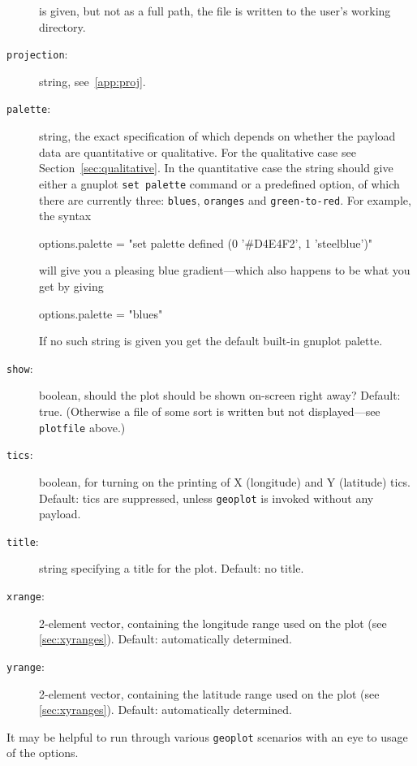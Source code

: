 \documentclass{article}
\begin{document}
\begin{description}
  is given, but not as a full path, the file is written to the user's
  working directory.
\item[\texttt{projection}:] string, see~\ref{app:proj}.
\item[\texttt{palette}:] string, the exact specification of which
  depends on whether the payload data are quantitative or
  qualitative. For the qualitative case see
  Section~\ref{sec:qualitative}. In the quantitative case the string
  should give either a \textsf{gnuplot} \texttt{set palette} command
  or a predefined option, of which there are currently three:
  \texttt{blues}, \texttt{oranges} and \texttt{green-to-red}. For
  example, the syntax
  \begin{code}
    options.palette = "set palette defined (0 '#D4E4F2', 1 'steelblue')"
  \end{code}
  will give you a pleasing blue gradient---which also happens to be
  what you get by giving
  \begin{code}
    options.palette = "blues"
  \end{code}
  If no such string is given you get the default built-in
  \textsf{gnuplot} palette.
\item[\texttt{show}:] boolean, should the plot should be shown
  on-screen right away? Default: true. (Otherwise a file of some sort
  is written but not displayed---see \texttt{plotfile} above.)
\item[\texttt{tics}:] boolean, for turning on the printing of X
  (longitude) and Y (latitude) tics. Default: tics are suppressed,
  unless \texttt{geoplot} is invoked without any payload.
\item[\texttt{title}:] string specifying a title for the
  plot. Default: no title.
\item[\texttt{xrange}:] 2-element vector, containing the longitude
  range used on the plot (see \ref{sec:xyranges}). Default:
  automatically determined.
\item[\texttt{yrange}:] 2-element vector, containing the latitude
  range used on the plot (see \ref{sec:xyranges}). Default:
  automatically determined.
\end{description}

It may be helpful to run through various \texttt{geoplot} scenarios
with an eye to usage of the options.
\end{document}
